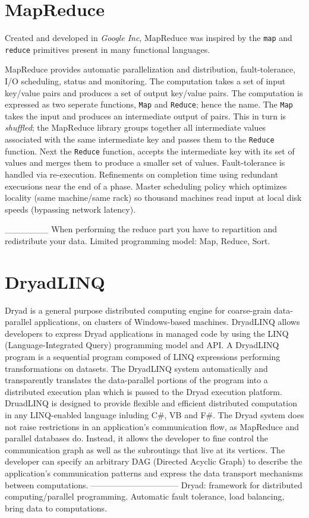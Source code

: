\documentclass[letterpaper,twocolumn,10pt]{article}
\begin{document}
\section{MapReduce}
Created and developed in \textit{Google Inc}, MapReduce was inspired by the {\tt map} and {\tt reduce} primitives present in many functional languages.

MapReduce provides automatic parallelization and distribution, fault-tolerance, I/O scheduling, status and monitoring. The computation takes a set of input key/value pairs and produces a set of output key/value pairs. The computation is expressed as two seperate functions, {\tt Map} and {\tt Reduce}; hence the name. The {\tt Map} takes the input and produces an intermediate output of pairs. This in turn is \textit{shuffled}; the MapReduce library groups together all intermediate values associated with the same intermediate key and passes them to the {\tt Reduce} function. Next the {\tt Reduce} function, accepts the intermediate key with its set of values and merges them to produce a smaller set of values.
Fault-tolerance is handled via re-execution. Refinements on completion time using redundant execusions near the end of a phase. Master scheduling policy which optimizes locality (same machine/same rack) so thousand machines read input at local disk speeds (bypassing network latency).

_______
When performing the reduce part you have to repartition and redistribute your data.
Limited programming model: Map, Reduce, Sort.

\section{DryadLINQ}
Dryad is a general purpose distributed computing engine for coarse-grain data-parallel applications, on clusters of Windows-based machines. DryadLINQ allows developers to express Dryad applications in managed code by using the LINQ (Language-Integrated Query) programming model and API.
A DryadLINQ program is a sequential program composed of LINQ expressions performing transformations on datasets. The DryadLINQ system automatically and transparently translates the data-parallel portions of the program into a distributed execution plan which is passed to the Dryad execution platform. DruadLINQ is designed to provide flexible and efficient distributed computation in any LINQ-enabled language inluding C\#, VB and F\#.
The Dryad system does not raise restrictions in an application's communication flow, as MapReduce and parallel databases do. Instead, it allows the developer to fine control the communication graph as well as the subroutings that live at its vertices. The developer can specify an arbitrary DAG (Directed Acyclic Graph) to describe the application's communication patterns and express the data transport mechanisms between computations.
--------------------------------
Dryad:
framework for distributed computing/parallel programming.
Automatic fault tolerance, load balancing, bring data to computations.
\end{document}
